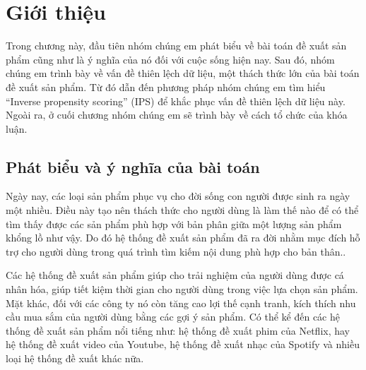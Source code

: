 \chapter{Giới thiệu}
\label{Chapter1}



Trong chương này, đầu tiên nhóm chúng em phát biểu về bài toán đề xuất sản phẩm cũng như là ý nghĩa của nó đối với cuộc sống hiện nay. Sau đó, nhóm chúng em trình bày về vấn đề thiên lệch dữ liệu, một thách thức lớn của bài toán đề xuất sản phẩm. Từ đó dẫn đến phương pháp nhóm chúng em tìm hiểu ``Inverse propensity scoring'' (IPS) để khắc phục vấn đề thiên lệch dữ liệu này. Ngoài ra, ở cuối chương nhóm chúng em sẽ trình bày về cách tổ chức của khóa luận.

\section{Phát biểu và ý nghĩa của bài toán}
Ngày nay, các loại sản phẩm phục vụ cho đời sống con người được sinh ra ngày một nhiều. Điều này tạo nên thách thức cho người dùng là làm thế nào để có thể tìm thấy được các sản phẩm phù hợp với bản phân giữa một lượng sản phẩm khổng lồ như vậy. Do đó hệ thống đề xuất sản phẩm đã ra đời nhằm mục đích hỗ trợ cho người dùng trong quá trình tìm kiếm nội dung phù hợp cho bản thân..

Các hệ thống đề xuất sản phẩm giúp cho trải nghiệm của người dùng được cá nhân hóa, giúp tiết kiệm thời gian cho người dùng trong việc lựa chọn sản phẩm. Mặt khác, đối với các công ty nó còn tăng cao lợi thế cạnh tranh, kích thích nhu cầu mua sắm của người dùng bằng các gợi ý sản phẩm. Có thể kể đến các hệ thống đề xuất sản phẩm nổi tiếng như: hệ thống đề xuất phim của Netflix, hay hệ thống đề xuất video của Youtube, hệ thống đề xuất nhạc của Spotify và nhiều loại hệ thống đề xuất khác nữa.

